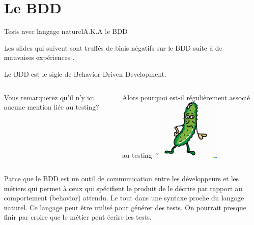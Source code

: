 \documentclass{beamer}
\begin{document}
    \section{Le BDD}\label{sec:le-bdd}
    \begin{frame}{Tests avec langage naturel}{A.K.A le BDD}
        \transdissolve

        \begin{dangercolorbox}
            Les slides qui suivent sont truffés de biais négatifs sur le BDD suite à de mauvaises expériences .

        \end{dangercolorbox}
        Le BDD est le sigle de Behavior-Driven Development.
        \begin{columns}
            Vous remarquerez qu'il n'y ici aucune mention liée au testing?

            Alors pourquoi est-il régulièrement associé au testing~?
            \centering
            \includegraphics[width=3cm]{image/funny-drawing-of-a-cucumber}
        \end{columns}
        Parce que le BDD est un outil de communication entre les développeurs et les métiers qui permet à ceux qui spécifient le produit de le décrire par rapport au comportement (behavior) attendu.
        Le tout dans une syntaxe proche du langage naturel.
        Ce langage peut être utilisé pour générer des tests.
        On pourrait presque finir par croire que le métier peut écrire les tests.
    \end{frame}
\end{document}
